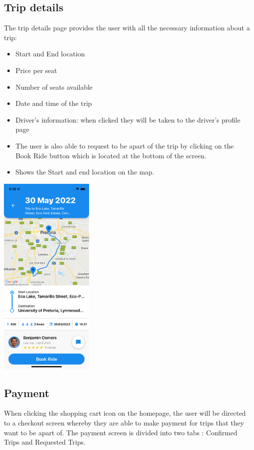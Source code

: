 \documentclass[hidelinks, 12pt, a4paper]{article}
\begin{document}
\subsection{Trip details}
The trip details page provides the user with all the necessary information about a trip:
\begin{itemize}
    \item Start and End location
    \item Price per seat
    \item Number of seats available
    \item Date and time of the trip
    \item Driver’s information: when clicked they will be taken to the driver’s profile page
    \item The user is also able to request to be apart of the trip by clicking on the Book Ride button which is located at the bottom of the screen.
    \item Shows the Start and end location on the map.
\end{itemize}
\begin{center}
  \includegraphics[height=10cm]{images/map_directions.png}
\end{center}

\subsection{Payment}
When clicking the shopping cart icon on the homepage, the user will be directed to a checkout screen whereby they are able to make payment for trips that they want to be apart of. The payment screen is divided into two tabs : Confirmed Trips and Requested Trips.
\end{document}
